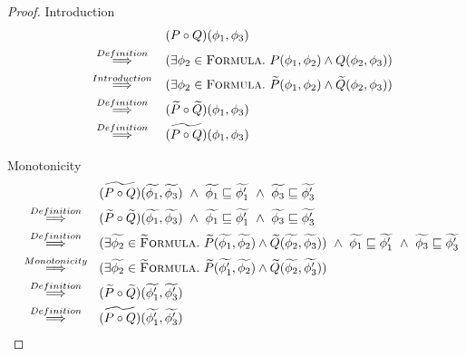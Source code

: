 \begin{proof}
    Introduction
        \begin{align*}
        &(P \circ Q)(\phi_1, \phi_3)\\
        \overset{Definition}{~\quad\quad\implies\quad\quad~}
        &(\exists \phi_2 \in \textup{\textsc{Formula}}.~ P(\phi_1, \phi_2) \wedge Q(\phi_2, \phi_3))\\
        \overset{Introduction}{~\quad\quad\implies\quad\quad~}
        &(\exists \phi_2 \in \textup{\textsc{Formula}}.~ \widetilde{P}(\phi_1, \phi_2) \wedge \widetilde{Q}(\phi_2, \phi_3))\\
        \overset{Definition}{~\quad\quad\implies\quad\quad~}
        &(\widetilde{P} \circ \widetilde{Q})(\phi_1, \phi_3)\\
        \overset{Definition}{~\quad\quad\implies\quad\quad~}
        &\widetilde{(P \circ Q)}(\phi_1, \phi_3)\\
        \end{align*}
        
    Monotonicity
        \begin{align*}
        &\widetilde{(P \circ Q)}(\widetilde{\phi_1}, \widetilde{\phi_3}) ~\wedge~ \widetilde{\phi_1} \sqsubseteq \widetilde{\phi_1'} ~\wedge~ \widetilde{\phi_3} \sqsubseteq \widetilde{\phi_3'}\\
        \overset{Definition}{~\quad\quad\implies\quad\quad~}
        &(\widetilde{P} \circ \widetilde{Q})(\widetilde{\phi_1}, \widetilde{\phi_3}) ~\wedge~ \widetilde{\phi_1} \sqsubseteq \widetilde{\phi_1'} ~\wedge~ \widetilde{\phi_3} \sqsubseteq \widetilde{\phi_3'}\\
        \overset{Definition}{~\quad\quad\implies\quad\quad~}
        &(\exists \widetilde{\phi_2} \in \textup{\textsc{\ensuremath{\widetilde{\text{F}}}ormula}}.~ \widetilde{P}(\widetilde{\phi_1}, \widetilde{\phi_2}) \wedge \widetilde{Q}(\widetilde{\phi_2}, \widetilde{\phi_3})) ~\wedge~ \widetilde{\phi_1} \sqsubseteq \widetilde{\phi_1'} ~\wedge~ \widetilde{\phi_3} \sqsubseteq \widetilde{\phi_3'}\\
        \overset{Monotonicity}{~\quad\quad\implies\quad\quad~}
        &(\exists \widetilde{\phi_2} \in \textup{\textsc{\ensuremath{\widetilde{\text{F}}}ormula}}.~ \widetilde{P}(\widetilde{\phi_1'}, \widetilde{\phi_2}) \wedge \widetilde{Q}(\widetilde{\phi_2}, \widetilde{\phi_3'}))\\
        \overset{Definition}{~\quad\quad\implies\quad\quad~}
        &(\widetilde{P} \circ \widetilde{Q})(\widetilde{\phi_1'}, \widetilde{\phi_3'})\\
        \overset{Definition}{~\quad\quad\implies\quad\quad~}
        &\widetilde{(P \circ Q)}(\widetilde{\phi_1'}, \widetilde{\phi_3'})\\
        \end{align*}
\end{proof}

